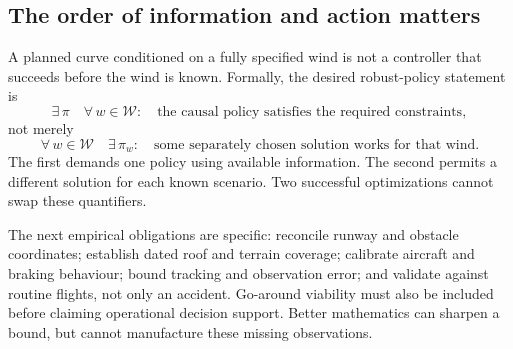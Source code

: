 \subsection*{The order of information and action matters}
A planned curve conditioned on a fully specified wind is not a controller that succeeds before the wind is known. Formally, the desired robust-policy statement is
\[
\exists\,\pi\quad\forall\,w\in\mathcal W:\quad
\text{the causal policy satisfies the required constraints},
\]
not merely
\[
\forall\,w\in\mathcal W\quad\exists\,\pi_w:\quad
\text{some separately chosen solution works for that wind}.
\]
The first demands one policy using available information. The second permits a different solution for each known scenario. Two successful optimizations cannot swap these quantifiers.

The next empirical obligations are specific: reconcile runway and obstacle coordinates; establish dated roof and terrain coverage; calibrate aircraft and braking behaviour; bound tracking and observation error; and validate against routine flights, not only an accident. Go-around viability must also be included before claiming operational decision support. Better mathematics can sharpen a bound, but cannot manufacture these missing observations.
\clearpage
